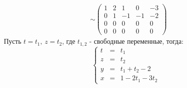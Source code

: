\documentclass[12pt]{article}
\begin{document}
\begin{sloppypar}
\begin{align*}
         & \sim
        \left(\begin{array}{rrrr|r}
                  1 & 2 & 1  & 0  & -3 \\
                  0 & 1 & -1 & -1 & -2 \\
                  0 & 0 & 0  & 0  & 0  \\
                  0 & 0 & 0  & 0  & 0
              \end{array}\right)
    \end{align*}
    Пусть $t = t_1,\ z = t_2$, где $t_{1,2}$ - свободные переменные, тогда:
    \[
        \left\{\begin{array}{rcl}
            t & = & t_1             \\
            z & = & t_2             \\
            y & = & t_1 + t_2 - 2   \\
            x & = & 1 - 2t_1 - 3t_2
        \end{array}\right.
    \]


\end{sloppypar}
\end{document}
